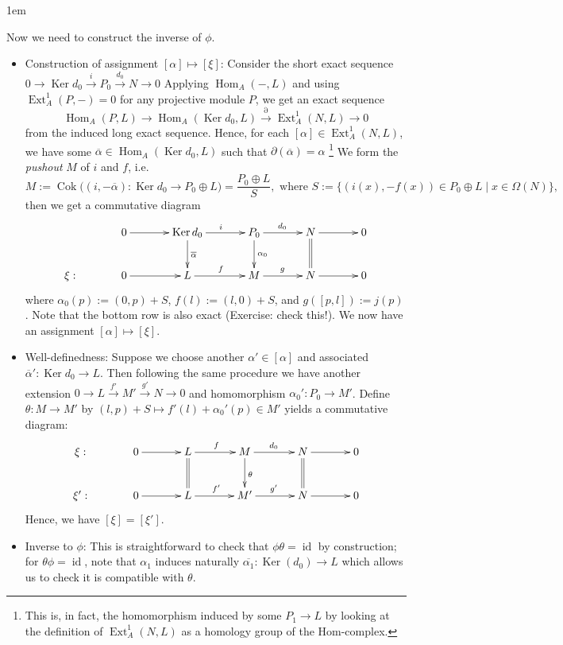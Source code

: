 \documentclass[11pt,a4paper]{article}
\makeatletter
\numberwithin{equation}{section}
\renewenvironment{proof}[1][\proofname]{\par
    \pushQED{\qed}%
    \normalfont \topsep0\p@\@plus6\p@ \labelsep1em\relax
    \trivlist
    \item[\hskip\labelsep\indent
        \bfseries #1]\ignorespaces
    \mbox{}
}{
    \popQED\endtrivlist\@endpefalse
}
\theoremstyle{all}
\theoremstyle{remark}
\newcommand{\id}{\operatorname{id}}
\newcommand{\Ext}{\operatorname{Ext}\nolimits}
\newcommand{\Hom}{\operatorname{Hom}\nolimits}
\newcommand{\Ker}{\operatorname{Ker}\nolimits}
\newcommand{\Cok}{\operatorname{Cok}\nolimits}
\newcommand{\defn}[1]{\textsl{\color{darkblue} #1}}
\makeatother
\begin{document}
\begin{proof}
Now we need to construct the inverse of $\phi$.
\begin{itemize}
\item Construction of assignment $[\alpha]\mapsto [\xi]$: 
Consider the short exact sequence $0\to \Ker d_0\xrightarrow{i} P_0\xrightarrow{d_0} N\to 0$
Applying $\Hom_A(-,L)$ and using $\Ext_A^1(P,-)=0$ for any projective module $P$, we get an exact sequence
\[
\Hom_A(P,L)\to \Hom_A(\Ker d_0,L)\xrightarrow{\partial} \Ext_A^1(N,L) \to 0
\]
from the induced long exact sequence.
Hence, for each $[\alpha] \in \Ext_A^1(N,L)$, we have some $\overline{\alpha}\in \Hom_A(\Ker d_0,L)$ such that $\partial(\overline{\alpha}) = \alpha$ \footnote{This is, in fact, the homomorphism induced by some $P_1\to L$ by looking at the definition of $\Ext_A^1(N,L)$ as a homology group of the Hom-complex.}
We form the \defn{pushout} $M$ of $i$ and $f$, i.e. 
\[
M:=\Cok\big((i,-\overline{\alpha}):\Ker d_0\to P_0\oplus L\big) = \frac{P_0\oplus L}{S}, \text{ where } S:=\{(i(x), -f(x))\in P_0\oplus L\mid x \in \Omega(N)\},\]
then we get a commutative diagram
\[
\xymatrix@C=35pt{
& 0\ar[r] & \Ker d_0 \ar[r]^{i}\ar[d]^{\overline{\alpha}} & P_0\ar[r]^{d_0} \ar[d]^{\alpha_0}& N\ar[r]\ar@{=}[d]&0 \\
\xi: &0\ar[r] & L \ar[r]^{f} & M\ar[r]^{g} & N\ar[r]&0
}
\]
where $\alpha_0(p):=(0,p)+S$, $f(l):=(l,0)+S$, and $g([p,l]):=j(p)$.
Note that the bottom row is also exact (Exercise: check this!).
We now have an assignment $[\alpha]\mapsto [\xi]$.

\item Well-definedness:  Suppose we choose another $\alpha'\in[\alpha]$ and associated $\overline{\alpha}':\Ker d_0\to L$.  Then following the same procedure we have another extension $0\to L\xrightarrow{f'} M'\xrightarrow{g'} N\to 0$ and homomorphism $\alpha_0':P_0\to M'$.  Define $\theta: M\to M'$ by $(l,p)+S \mapsto f'(l)+\alpha_0'(p) \in M'$ yields a commutative diagram:
\[
\xymatrix@C=35pt{
\xi:& 0\ar[r] & L \ar[r]^{f}\ar@{=}[d] & M\ar[r]^{d_0} \ar[d]^{\theta}& N\ar[r]\ar@{=}[d]&0 \\
\xi': &0\ar[r] & L \ar[r]^{f'} & M'\ar[r]^{g'} & N\ar[r]&0
}
\]
Hence, we have $[\xi]=[\xi']$.

\item Inverse to $\phi$:  This is straightforward to check that $\phi\theta=\id$ by construction; for $\theta\phi=\id$, note that $\alpha_1$ induces naturally $\overline{\alpha_1}:\Ker(d_0)\to L$ which allows us to check it is compatible with $\theta$.
\end{itemize}
\end{proof}
\end{document}
